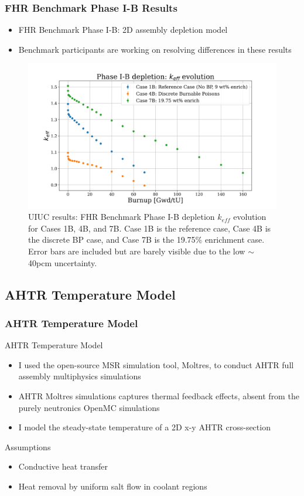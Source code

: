 \begin{frame}
    \frametitle{FHR Benchmark Phase I-B Results}
    \begin{itemize}
        \item FHR Benchmark Phase I-B: 2D assembly depletion model
        \item Benchmark participants are working on resolving differences in 
        these results
    \end{itemize}
    \vspace{-0.2cm}
    \begin{figure}[]
        \centering
        \includegraphics[width=0.75\linewidth]{../docs/figures/phase1b_keff.png} 
        \caption{UIUC results: FHR Benchmark Phase I-B depletion 
        $k_{eff}$ evolution for Cases 1B, 4B, and 7B. Case 1B is the reference case, 
        Case 4B is the discrete \acrlong{BP} case, and Case 7B is the 19.75$\%$ 
        enrichment case. Error bars are included but are barely visible due to the 
        low $\sim$40pcm uncertainty.}
    \end{figure}
\end{frame}

\subsection{AHTR Temperature Model}
\begin{frame}
    \frametitle{AHTR Temperature Model}
    \begin{block}{AHTR Temperature Model}
        \begin{itemize}
            \item I used the open-source MSR simulation tool, Moltres, to conduct AHTR
            full assembly multiphysics simulations 
            \item AHTR Moltres simulations captures thermal feedback effects, absent
            from the purely neutronics OpenMC simulations
            \item I model the steady-state temperature of a 2D x-y AHTR cross-section
        \end{itemize}
    \end{block}
    \begin{block}{Assumptions}
        \begin{itemize}
            \item Conductive heat transfer 
            \item Heat removal by uniform salt flow in coolant regions
        \end{itemize}
    \end{block}

\end{frame}

